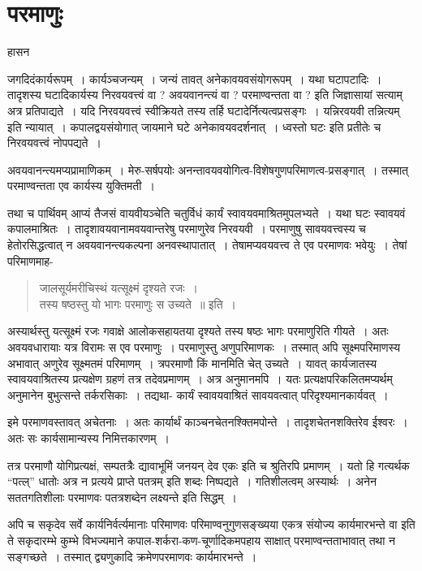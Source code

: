 {\fontsize{15}{17}\selectfont
\chapter{परमाणुः}

\begin{center}
\smallskip
हासन
\addrule
\end{center}
जगदिदंकार्यरूपम्~। कार्यञ्चजन्यम्~। जन्यं तावत् अनेकावयवसंयोगरूपम्~। यथा घटापटादिः~। तादृशस्य घटादिकार्यस्य निरवयवत्त्वं वा ? अवयवानन्त्यं वा ? परमाण्वन्तता वा ? इति जिज्ञासायां सत्याम् अत्र प्रतिपाद्यते~। यदि निरवयवत्त्वं स्वीक्रियते तस्य तर्हि घटादेर्नित्यत्वप्रसङ्गः~। यन्निरवयवी तन्नित्यम् इति न्यायात्~। कपालद्वयसंयोगात् जायमाने घटे अनेकावयवदर्शनात्~। ध्वस्तो घटः इति प्रतीतेः च निरवयवत्त्वं नोपपद्यते~। 

अवयवानन्त्यमप्यप्रामाणिकम्~। मेरु-सर्षपयोः अनन्तावयवयोगित्व-विशेषगुणपरिमाण\-त्व-प्रसङ्गात्~। तस्मात् परमाण्वन्तता एव कार्यस्य युक्तिमती~। 

तथा च पार्थिवम् आप्यं तैजसं वायवीयञ्चेति चतुर्विधं कार्यं स्वावयवमाश्रितमुपलभ्यते~। यथा घटः स्वावयवं कपालमाश्रितः~। तादृशावयवानामवयवान्तरेषु परमाणुरेव निरवयवी~। परमाणुषु सावयवत्त्वस्य च हेतोरसिद्धत्वात् न अवयवानन्त्यकल्पना अनवस्थापातात्~। तेषामप्यवयवत्त्व ते एव परमाणवः भवेयुः~। तेषां परिमाणमाह-
\begin{verse}
जालसूर्यमरीचिस्थं यत्सूक्ष्मं दृश्यते रजः~। \\
तस्य षष्ठस्तु यो भागः परमाणुः स उच्यते~॥ इति~। 
\end{verse}
अस्यार्थस्तु यत्सूक्ष्मं रजः गवाक्षे आलोकसहायतया दृश्यते तस्य षष्ठः भागः परमाणुरिति गीयते~। अतः अवयवधारायाः यत्र विरामः स एव परमाणुः~। परमाणुस्तु अणुपरिमाणकः~। तस्मात् अपि सूक्ष्मपरिमाणस्य अभावात् अणुरेव सूक्ष्मतमं परिमाणम्~। त्रपरमाणौ किं मानमिति चेत् उच्यते~। यावत् कार्यजातस्य स्वावयवाश्रितस्य प्रत्यक्षेण ग्रहणं तत्र तदेवप्रमाणम्~। अत्र अनुमानमपि~। यतः प्रत्यक्षपरिकलितमप्यर्थम् अनुमानेन बुभुत्सन्ते तर्करसिकाः~। तद्यथा- कार्यं स्वावयवाश्रितं सावयवत्वात् परिदृश्यमानकार्यवत्~। 

इमे परमाणवस्तावत् अचेतनाः~। अतः कार्यार्थं काञ्चनचेतनश्क्तिमपोन्ते~। तादृशचेतनशक्तिरेव ईश्वरः~। अतः सः कार्यसामान्यस्य निमित्तकारणम्~। 

तत्र परमाणौ योगिप्रत्यक्षं, सम्पतत्रैः द्यावाभूमिं जनयन् देव एकः इति च श्रुतिरपि प्रमाणम्~। यतो हि गत्यर्थक “पत्ल्” धातोः अत्र न प्रत्यये प्राप्ते पतत्रम् इति शब्दः निष्पद्यते~। गतिशीलत्वम् अस्यार्थः~। अनेन सततगतिशीलाः परमाणवः पतत्रशब्देन लक्ष्यन्ते इति सिद्धम्~। 

अपि च सकृदेव सर्वे कार्यनिर्वर्त्यमानाः परिमाणवः परिमाण्वनुगुणसङ्ख्यया एकत्र संयोज्य कार्यमारभन्ते वा इति ते सकृदारम्भे कुम्भे विभज्यमाने कपाल-शर्करा-कण-चूर्णादिकमपहाय साक्षात् परमाण्वन्तताभावात् तथा न सङ्गच्छते~। तस्मात् द्व्यणुकादि क्रमेणपरमाणवः कार्यमारभन्ते~। 

}
